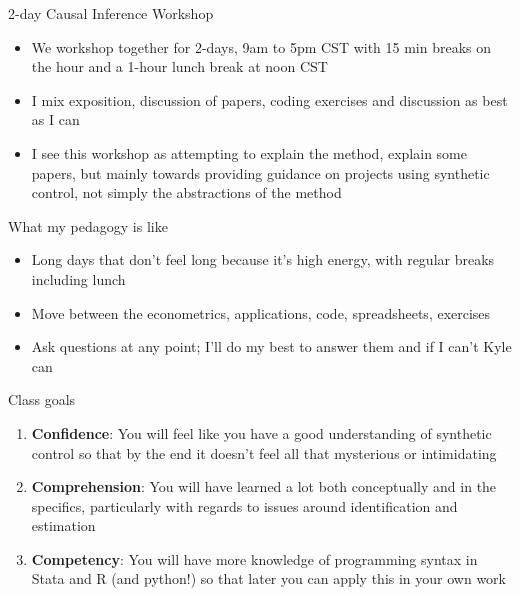 \documentclass{beamer}
\begin{document}
\begin{frame}{2-day Causal Inference Workshop}

  \begin{itemize}
    \item We workshop together for 2-days, 9am to 5pm CST with 15 min breaks on the hour and a 1-hour lunch break at noon CST
    \item I mix exposition, discussion of papers, coding exercises and discussion as best as I can
    \item I see this workshop as attempting to explain the method, explain some papers, but mainly towards providing guidance on projects using synthetic control, not simply the abstractions of the method 
  \end{itemize}

\end{frame}

\begin{frame}{What my pedagogy is like}

\begin{itemize}
\item Long days that don't feel long because it's high energy, with regular breaks including lunch
\item Move between the econometrics, applications, code, spreadsheets, exercises
\item Ask questions at any point; I'll do my best to answer them and if I can't Kyle can
\end{itemize}

\end{frame}



\begin{frame}{Class goals}

  \begin{enumerate}
    \item \textbf{Confidence}: You will feel like you have a good understanding of synthetic control so that by the end it doesn't feel all that mysterious or intimidating
    \item \textbf{Comprehension}: You will have learned a lot both conceptually and in the specifics, particularly with regards to issues around identification and estimation
    \item \textbf{Competency}: You will have more knowledge of programming syntax in Stata and R (and python!) so that later you can apply this in your own work
  \end{enumerate}

\end{frame}
\end{document}
